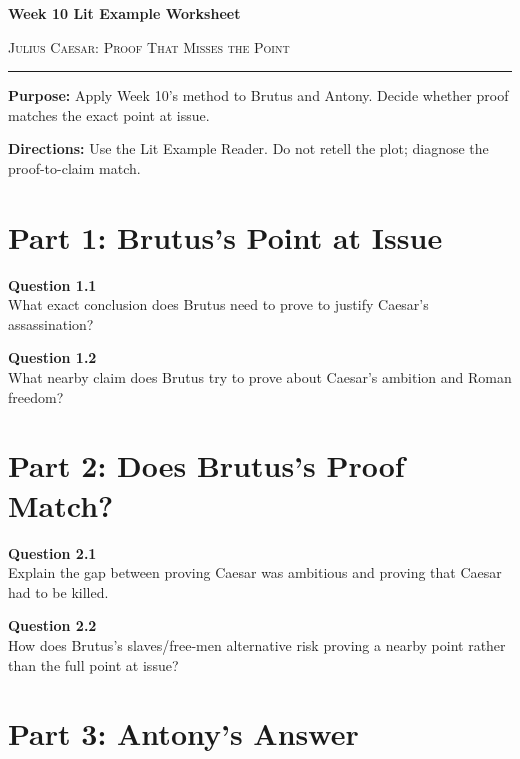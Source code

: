 \documentclass[12pt]{article}
\begin{document}
\begin{center}
{\LARGE\bfseries Week 10 Lit Example Worksheet}\par\vspace{0.05em}
{\large\scshape Julius Caesar: Proof That Misses the Point}\par\vspace{0.12em}
\rule{0.78\textwidth}{0.5pt}
\end{center}

\textbf{Purpose:} Apply Week 10's method to Brutus and Antony. Decide whether proof matches the exact point at issue.

\textbf{Directions:} Use the Lit Example Reader. Do not retell the plot; diagnose the proof-to-claim match.

\section*{Part 1: Brutus's Point at Issue}

\textbf{Question 1.1}\\[-0.15em]
What exact conclusion does Brutus need to prove to justify Caesar's assassination?


\textbf{Question 1.2}\\[-0.15em]
What nearby claim does Brutus try to prove about Caesar's ambition and Roman freedom?


\newpage

\section*{Part 2: Does Brutus's Proof Match?}

\textbf{Question 2.1}\\[-0.15em]
Explain the gap between proving Caesar was ambitious and proving that Caesar had to be killed.


\textbf{Question 2.2}\\[-0.15em]
How does Brutus's slaves/free-men alternative risk proving a nearby point rather than the full point at issue?


\newpage

\section*{Part 3: Antony's Answer}
\end{document}
